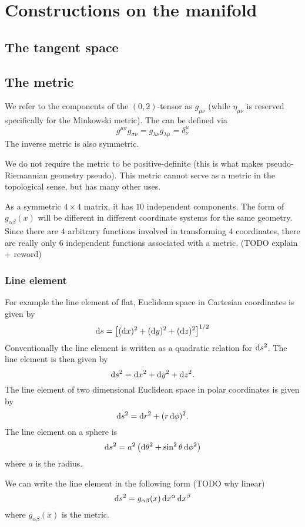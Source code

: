 \section{Constructions on the manifold}
\subsection{The tangent space}

\subsection{The metric}
We refer to the components of the $(0,2)$-tensor as $g_{\mu\nu}$ (while $\eta_{\mu\nu}$ is reserved specifically for the Minkowski metric). The  can be defined via
\[ g^{\mu\sigma}g_{\sigma\nu} = g_{\lambda\nu}g_{\lambda\mu} = \delta^{\mu}_{\nu} \]
The inverse metric is also symmetric.

We do not require the metric to be positive-definite (this is what makes pseudo-Riemannian geometry pseudo). This metric cannot serve as a metric in the topological sense, but has many other uses. 

As a symmetric $4\times 4$ matrix, it has $10$ independent components. The form of $g_{\alpha\beta}(x)$ will be different in different coordinate systems for the same geometry. Since there are $4$ arbitrary functions involved in transforming $4$ coordinates, there are really only $6$ independent functions associated with a metric. (TODO explain + reword)

\subsubsection{Line element}
For example the line element of flat, Euclidean space in Cartesian coordinates is given by
\[ \operatorname{d \!}{s} = \left[(\operatorname{d \!}{x})^2 + (\operatorname{d \!}{y})^2 + (\operatorname{d \!}{z})^2\right]^{1/2} \]
Conventionally the line element is written as a quadratic relation for $\operatorname{d \!}{s}^2$. 
The line element is then given by
\[ \operatorname{d \!}{s}^2 = \operatorname{d \!}{x}^2 + \operatorname{d \!}{y}^2 + \operatorname{d \!}{z}^2.  \]
The line element of two dimensional Euclidean space in polar coordinates is given by
\[ \operatorname{d \!}{s}^2 = \operatorname{d \!}{r}^2 + (r \operatorname{d \!}{\phi})^2. \]
The line element on a sphere is
\[ \operatorname{d \!}{s}^2 = a^2 \left(\operatorname{d \!}{\theta}^2 + \sin^2\theta \operatorname{d \!}{\phi}^2\right) \]
where $a$ is the radius.

We can write the line element in the following form (TODO why linear)
\[ \operatorname{d \!}{s}^2 = g_{\alpha\beta}(x)\operatorname{d \!}{x^\alpha}\operatorname{d \!}{x^\beta} \]
where $g_{\alpha\beta}(x)$ is the metric.


